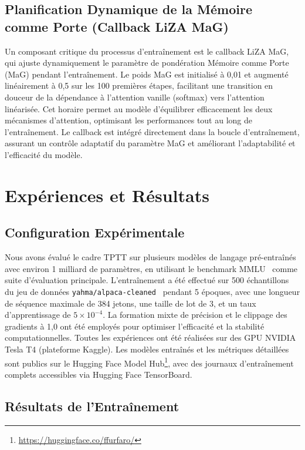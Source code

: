 \documentclass[10pt,a4paper]{article}
\begin{document}
\subsection{Planification Dynamique de la Mémoire comme Porte (Callback LiZA MaG)}

Un composant critique du processus d'entraînement est le callback LiZA MaG, qui ajuste dynamiquement le paramètre de pondération Mémoire comme Porte (MaG) pendant l'entraînement. Le poids MaG est initialisé à 0,01 et augmenté linéairement à 0,5 sur les 100 premières étapes, facilitant une transition en douceur de la dépendance à l'attention vanille (softmax) vers l'attention linéarisée. Cet horaire permet au modèle d'équilibrer efficacement les deux mécanismes d'attention, optimisant les performances tout au long de l'entraînement. Le callback est intégré directement dans la boucle d'entraînement, assurant un contrôle adaptatif du paramètre MaG et améliorant l'adaptabilité et l'efficacité du modèle.

\section{Expériences et Résultats}

\subsection{Configuration Expérimentale}

Nous avons évalué le cadre TPTT sur plusieurs modèles de langage pré-entraînés avec environ 1 milliard de paramètres, en utilisant le benchmark MMLU~\cite{hendrycks2020measuring} comme suite d'évaluation principale. L'entraînement a été effectué sur 500 échantillons du jeu de données \texttt{yahma/alpaca-cleaned}~\cite{taori2023alpaca} pendant 5 époques, avec une longueur de séquence maximale de 384 jetons, une taille de lot de 3, et un taux d'apprentissage de $5 \times 10^{-4}$. La formation mixte de précision et le clippage des gradients à 1,0 ont été employés pour optimiser l'efficacité et la stabilité computationnelles. Toutes les expériences ont été réalisées sur des GPU NVIDIA Tesla T4 (plateforme Kaggle). Les modèles entraînés et les métriques détaillées sont publics sur le Hugging Face Model Hub\footnote{\url{https://huggingface.co/ffurfaro/}}, avec des journaux d'entraînement complets accessibles via Hugging Face TensorBoard.

\subsection{Résultats de l'Entraînement}
\end{document}
